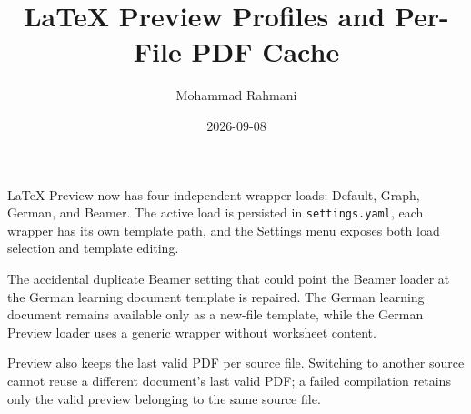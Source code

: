 \documentclass[a4paper]{article}
\title{LaTeX Preview Profiles and Per-File PDF Cache}
\date{2026-09-08}
\author{Mohammad Rahmani}
\begin{document}
   \maketitle

   LaTeX Preview now has four independent wrapper loads: Default, Graph, German, and Beamer. The active load is persisted in \texttt{settings.yaml}, each wrapper has its own template path, and the Settings menu exposes both load selection and template editing.

   The accidental duplicate Beamer setting that could point the Beamer loader at the German learning document template is repaired. The German learning document remains available only as a new-file template, while the German Preview loader uses a generic wrapper without worksheet content.

   Preview also keeps the last valid PDF per source file. Switching to another source cannot reuse a different document's last valid PDF; a failed compilation retains only the valid preview belonging to the same source file.

   
   
\end{document}
